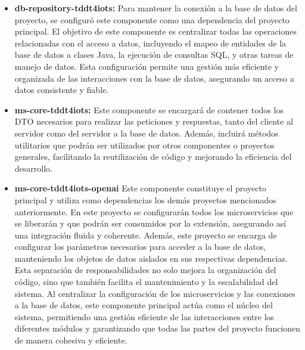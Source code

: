 \begin{itemize}
	\item \textbf{db-repository-tddt4iots: } Para mantener la conexión a la base de datos del proyecto, se configuró este componente como una dependencia del proyecto principal. El objetivo de este componente es centralizar todas las operaciones relacionadas con el acceso a datos, incluyendo el mapeo de entidades de la base de datos a clases Java, la ejecución de consultas SQL, y otras tareas de manejo de datos. Esta configuración permite una gestión más eficiente y organizada de las interacciones con la base de datos, asegurando un acceso a datos consistente y fiable.
	
	\item \textbf{ms-core-tddt4iots: } Este componente se encargará de contener todos los DTO necesarios para realizar las peticiones y respuestas, tanto del cliente al servidor como del servidor a la base de datos. Además, incluirá métodos utilitarios que podrán ser utilizados por otros componentes o proyectos generales, facilitando la reutilización de código y mejorando la eficiencia del desarrollo.
	
	\item \textbf{ms-core-tddt4iots-openai} Este componente constituye el proyecto principal y utiliza como dependencias los demás proyectos mencionados anteriormente. En este proyecto se configurarán todos los microservicios que se liberarán y que podrán ser consumidos por la extensión, asegurando así una integración fluida y coherente. Además, este proyecto se encarga de configurar los parámetros necesarios para acceder a la base de datos, manteniendo los objetos de datos aislados en sus respectivas dependencias. Esta separación de responsabilidades no solo mejora la organización del código, sino que también facilita el mantenimiento y la escalabilidad del sistema. Al centralizar la configuración de los microservicios y las conexiones a la base de datos, este componente principal actúa como el núcleo del sistema, permitiendo una gestión eficiente de las interacciones entre los diferentes módulos y garantizando que todas las partes del proyecto funcionen de manera cohesiva y eficiente. 
	

\end{itemize}
